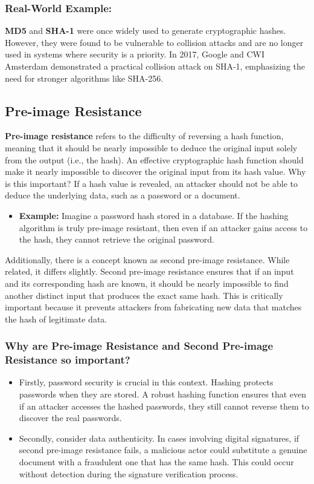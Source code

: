 \documentclass[11pt,a4paper]{article}
\begin{document}
        \subsubsection*{Real-World Example:}
        \textbf{MD5} and \textbf{SHA-1} were once widely used to generate cryptographic hashes. However, they were found to be vulnerable to collision attacks and are no longer used in systems where security is a priority. In 2017, Google and CWI Amsterdam demonstrated a practical collision attack on SHA-1, emphasizing the need for stronger algorithms like SHA-256.
        
    \subsection*{Pre-image Resistance}
    \textbf{Pre-image resistance} refers to the difficulty of reversing a hash function, meaning that it should be nearly impossible to deduce the original input solely from the output (i.e., the hash). An effective cryptographic hash function should make it nearly impossible to discover the original input from its hash value. Why is this important? If a hash value is revealed, an attacker should not be able to deduce the underlying data, such as a password or a document.
        \begin{itemize}
            \item \textbf{Example:} Imagine a password hash stored in a database. If the hashing algorithm is truly pre-image resistant, then even if an attacker gains access to the hash, they cannot retrieve the original password.

        \end{itemize}

    Additionally, there is a concept known as second pre-image resistance. While related, it differs slightly. Second pre-image resistance ensures that if an input and its corresponding hash are known, it should be nearly impossible to find another distinct input that produces the exact same hash. This is critically important because it prevents attackers from fabricating new data that matches the hash of legitimate data.

        \subsubsection*{Why are Pre-image Resistance and Second Pre-image Resistance so important?}
            \begin{itemize}
                \item Firstly, password security is crucial in this context. Hashing protects passwords when they are stored. A robust hashing function ensures that even if an attacker accesses the hashed passwords, they still cannot reverse them to discover the real passwords.
                \item Secondly, consider data authenticity. In cases involving digital signatures, if second pre-image resistance fails, a malicious actor could substitute a genuine document with a fraudulent one that has the same hash. This could occur without detection during the signature verification process.


            \end{itemize}
\end{document}
